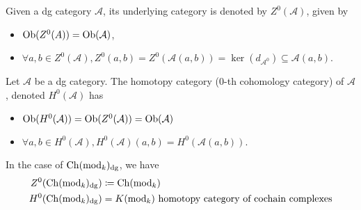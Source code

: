 \begin{construction}
	Given a dg category $ \mathcal{ A } $, its underlying category is denoted by $ Z^0 ( \mathcal{ A } ) $, given by
	\begin{itemize}
		\item 
		$ \operatorname{Ob} ( Z^0 ( A ) ) = \operatorname{Ob} ( \mathcal{ A } ) $,
		
		\item 
		$ \forall a , b \in Z^0 ( \mathcal{ A } ), Z^0 ( a , b ) = Z^0 ( \mathcal{ A } ( a , b ) ) = \ker ( d_{ \mathcal{ A }^0 } ) \subseteq \mathcal{ A } ( a , b ) $.
	\end{itemize}
\end{construction}

\begin{defi}
	Let $ \mathcal{ A } $ be a dg category. 
	The homotopy category (0-th cohomology category) of $ \mathcal{ A } $, denoted $ H^0 ( \mathcal{ A } ) $ has
	\begin{itemize}
		\item 
		$ \operatorname{Ob} ( H^0 ( \mathcal{ A } ) ) = \operatorname{Ob} ( Z^0 ( \mathcal{ A } ) ) = \operatorname{Ob} ( \mathcal{ A } ) $
		
		\item 
		$ \forall a ,b \in H^0 ( \mathcal{ A } ), H^0 ( \mathcal{ A } ) ( a , b ) = H^0 ( \mathcal{ A } ( a , b ) ) $.
	\end{itemize}
\end{defi}

In the case of $ \operatorname{Ch} ( \operatorname{mod}_k )_{ \operatorname{dg} } $, we have 
\begin{align*}
	Z^0 ( \operatorname{Ch} ( \operatorname{mod}_k)_{ \operatorname{dg} } ) 
	&\coloneqq
	\operatorname{Ch} ( \operatorname{mod}_k )
	\\
	H^0 ( \operatorname{Ch} ( \operatorname{mod}_k )_{ \operatorname{dg} } ) 
	&=
	K ( \operatorname{mod}_k ) \text{ homotopy category of cochain complexes}
\end{align*}

